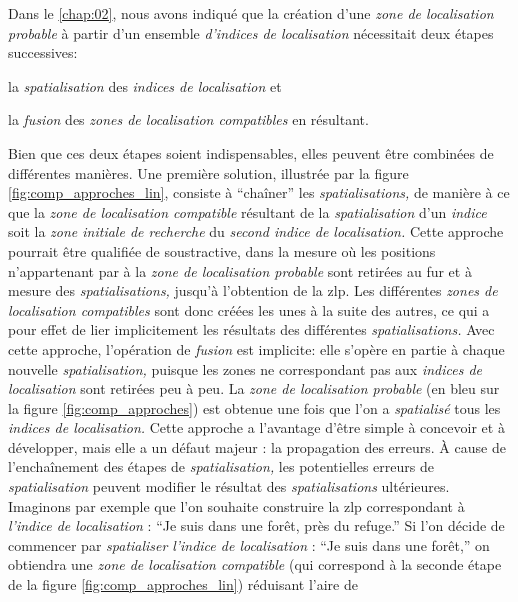 Dans le \autoref{chap:02}, nous avons indiqué que la création d'une
\emph{zone de localisation probable} à partir d'un ensemble
\emph{d'indices de localisation} nécessitait deux étapes successives:
% 
\begin{enumerate*}[label=(\alph*)]
\item la \emph{spatialisation} des \emph{indices de localisation} et
\item la \emph{fusion} des \emph{zones de localisation compatibles} en
résultant.
\end{enumerate*}
% 
Bien que ces deux étapes soient indispensables, elles peuvent être
combinées de différentes manières. Une première solution, illustrée
par la figure \ref{fig:comp_approches_lin}, consiste à
\enquote{chaîner} les \emph{spatialisations,} de manière à ce que la
\emph{zone de localisation compatible} résultant de la
\emph{spatialisation} d'un \emph{indice} soit la \emph{zone initiale
  de recherche} du \emph{second indice de localisation.} Cette
approche pourrait être qualifiée de soustractive, dans la mesure où
les positions n'appartenant par à la \emph{zone de localisation
  probable} sont retirées au fur et à mesure des
\emph{spatialisations,} jusqu'à l'obtention de la \ac{zlp}. Les
différentes \emph{zones de localisation compatibles} sont donc créées
les unes à la suite des autres, ce qui a pour effet de lier
implicitement les résultats des différentes \emph{spatialisations.}
Avec cette approche, l'opération de \emph{fusion} est implicite: elle
s'opère en partie à chaque nouvelle \emph{spatialisation,} puisque les
zones ne correspondant pas aux \emph{indices de localisation} sont
retirées peu à peu. La \emph{zone de localisation probable} (en bleu
sur la figure \ref{fig:comp_approches}) est obtenue une fois que l'on
a \emph{spatialisé} tous les \emph{indices de localisation.} Cette
approche a l'avantage d'être simple à concevoir et à développer, mais
elle a un défaut majeur : la propagation des erreurs. À cause de
l'enchaînement des étapes de \emph{spatialisation,} les potentielles
erreurs de \emph{spatialisation} peuvent modifier le résultat des
\emph{spatialisations} ultérieures. Imaginons par exemple que l'on
souhaite construire la \ac{zlp} correspondant à \emph{l'indice de
  localisation} : \enquote{Je suis dans une forêt, près du refuge.} Si
l'on décide de commencer par \emph{spatialiser} \emph{l'indice de
  localisation} : \enquote{Je suis dans une forêt,} on obtiendra une
\emph{zone de localisation compatible} (qui correspond à la seconde
étape de la figure \ref{fig:comp_approches_lin}) réduisant l'aire de
